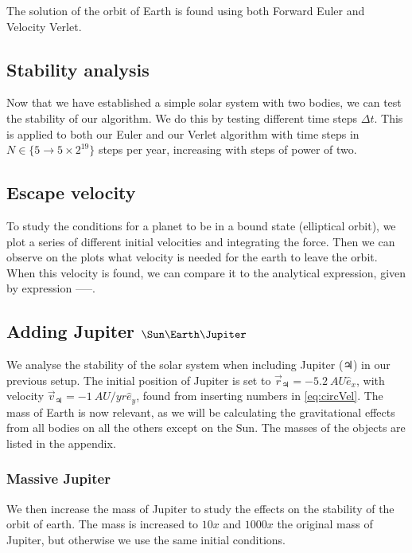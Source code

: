 \documentclass[10pt]{article}
\begin{document}
\begin{multicols}{2}
The solution of the orbit of Earth is found using both Forward Euler and
Velocity Verlet. 

\subsection{}

\subsection{Stability analysis}
Now that we have established a simple solar system with two bodies, we can
test the stability of our algorithm. We do this by testing different time
steps $\Delta t$. This is applied to both our Euler and our Verlet
algorithm with time steps in $N \in \{5 \to 5 \times 2^{19}\}$ steps per year,
increasing with steps of power of two.

\subsection{Escape velocity}
To study the conditions for a planet to be in a bound state (elliptical orbit), we plot a series of different initial velocities and integrating the force. Then we can observe on the plots what velocity is needed for the earth to leave the orbit. When this velocity is found, we can compare it to the analytical expression, given by expression -----. 

\subsection{Adding Jupiter \texorpdfstring{$\Sun\Earth\Jupiter$}{}}

We analyse the stability of the solar system when including Jupiter
($\Jupiter$) in our previous setup. The initial position of Jupiter is set to
$\vec r_\Jupiter = -\SI{5.2}{AU}\hat e_x$, with velocity $\vec v_\Jupiter =
-\SI{1}{AU/yr}\hat e_y$, found from inserting numbers in \cref{eq:circVel}.
The mass of Earth is now relevant, as we will be calculating the
gravitational effects from all bodies on all the others except on the Sun.
The masses of the objects are listed in the appendix.

\subsubsection{Massive Jupiter }
We then increase the mass of Jupiter to study the effects on the stability
of the orbit of earth. The mass is increased to $10x$ and $1000x$ the
original mass of Jupiter, but otherwise we use the same initial conditions.


\end{multicols}
\end{document}
